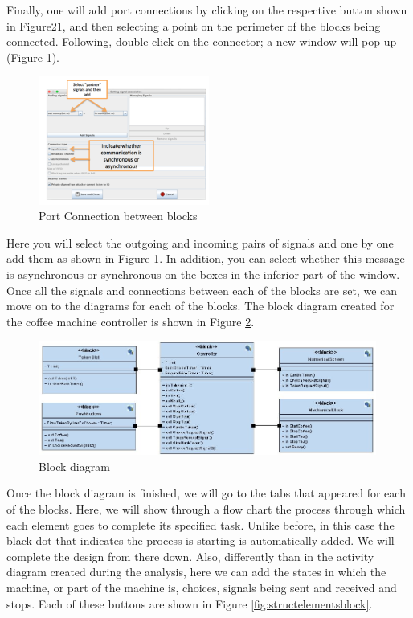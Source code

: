 \documentclass[12pt]{article}
\begin{document}
	Finally, one will add port connections by clicking on the respective button shown in Figure21, and then selecting a point on the perimeter of the blocks being connected. Following, double click on the connector; a new window will pop up (Figure \ref{fig:portconn}). 
	
	\begin{figure}[htbp]
\centering
\includegraphics[width=0.5\textwidth]{fig/portconn.png}
\caption{Port Connection between blocks} \label{fig:portconn}
\end{figure}

	Here you will select the outgoing and incoming pairs of signals and one by one add them as shown in Figure \ref{fig:portconn}. In addition, you can select whether this message is asynchronous or synchronous on the boxes in the inferior part of the window. Once all the signals and connections between each of the blocks are set, we can move on to the diagrams for each of the blocks.
The block diagram created for the coffee machine controller is shown in Figure \ref{fig:blockdiag}.

	\begin{figure}[htbp]
\centering
\includegraphics[width=0.99\textwidth]{fig/blockdiag.jpg}
\caption{Block diagram} \label{fig:blockdiag}
\end{figure}

Once the block diagram is finished, we will go to the tabs that appeared for each of the blocks. Here, we will show through a flow chart the process through which each element goes to complete its specified task. Unlike before, in this case the black dot that indicates the process is starting is automatically added. We will complete the design from there down. Also, differently than in the activity diagram created during the analysis, here we can add the states in which the machine, or part of the machine is, choices, signals being sent and received and stops. Each of these buttons are shown in Figure \ref{fig:structelementsblock}. 
\end{document}
